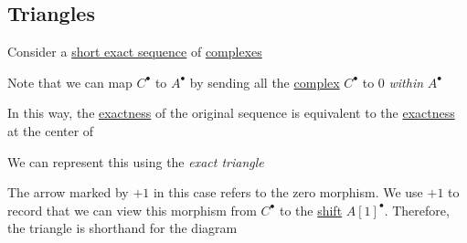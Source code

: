 \documentclass[../../../main]{subfiles}
\begin{document}
\subsection*{Triangles}
Consider a \hyperref[def:short-exact-sequence]{short exact sequence} of \hyperref[def:complex]{complexes}
\begin{center}
\end{center}
Note that we can map \(C^{\bullet}\) to \(A^{\bullet}\) by sending all the \hyperref[def:complex]{complex} \(C^{\bullet}\) to \(0\) \textit{within} \(A^{\bullet}\)
\begin{center}
\end{center}
In this way, the \hyperref[def:exact-complex]{exactness} of the original sequence is equivalent to the \hyperref[def:exact-complex]{exactness} at the center of
\begin{center}
\end{center}
We can represent this using the \textit{exact triangle}
\begin{center}
\end{center}
The arrow marked by \(+1\) in this case refers to the zero morphism. We use \(+1\) to record that we can view this morphism from \(C^{\bullet}\) to the \hyperref[def:shift-functor]{shift} \(A[1]^{\bullet}\).
Therefore, the triangle is shorthand for the diagram
\end{document}
